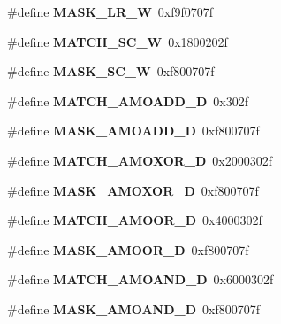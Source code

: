 \begin{DoxyCompactItemize}
\#define {\bfseries M\+A\+S\+K\+\_\+\+L\+R\+\_\+W}~0xf9f0707f
\item 
\mbox{\label{riscv-utility_8h_a02c529c491f7771186007d0417834a3f}} 
\#define {\bfseries M\+A\+T\+C\+H\+\_\+\+S\+C\+\_\+W}~0x1800202f
\item 
\mbox{\label{riscv-utility_8h_abb1c9388872f4a23affbdaf4e092c2d9}} 
\#define {\bfseries M\+A\+S\+K\+\_\+\+S\+C\+\_\+W}~0xf800707f
\item 
\mbox{\label{riscv-utility_8h_ae860d32433f21a52cad37d7a7d9f0799}} 
\#define {\bfseries M\+A\+T\+C\+H\+\_\+\+A\+M\+O\+A\+D\+D\+\_\+D}~0x302f
\item 
\mbox{\label{riscv-utility_8h_a93b052527af1b734bd5d0d128e457a21}} 
\#define {\bfseries M\+A\+S\+K\+\_\+\+A\+M\+O\+A\+D\+D\+\_\+D}~0xf800707f
\item 
\mbox{\label{riscv-utility_8h_ace5f7bf5c45f81fe953c07c981321386}} 
\#define {\bfseries M\+A\+T\+C\+H\+\_\+\+A\+M\+O\+X\+O\+R\+\_\+D}~0x2000302f
\item 
\mbox{\label{riscv-utility_8h_a9322420a17f63d695491b48ba3cf74d2}} 
\#define {\bfseries M\+A\+S\+K\+\_\+\+A\+M\+O\+X\+O\+R\+\_\+D}~0xf800707f
\item 
\mbox{\label{riscv-utility_8h_a90c3f778844ccc18343406b2cd53a9fe}} 
\#define {\bfseries M\+A\+T\+C\+H\+\_\+\+A\+M\+O\+O\+R\+\_\+D}~0x4000302f
\item 
\mbox{\label{riscv-utility_8h_aa3f836eaf0ce1afe7c087136e2a5fcf1}} 
\#define {\bfseries M\+A\+S\+K\+\_\+\+A\+M\+O\+O\+R\+\_\+D}~0xf800707f
\item 
\mbox{\label{riscv-utility_8h_acc5e843da4b3373597a8ea7086653482}} 
\#define {\bfseries M\+A\+T\+C\+H\+\_\+\+A\+M\+O\+A\+N\+D\+\_\+D}~0x6000302f
\item 
\mbox{\label{riscv-utility_8h_ad798228eb61ed10f0f3cf7872cb6bae3}} 
\#define {\bfseries M\+A\+S\+K\+\_\+\+A\+M\+O\+A\+N\+D\+\_\+D}~0xf800707f
\item 

\end{DoxyCompactItemize}
